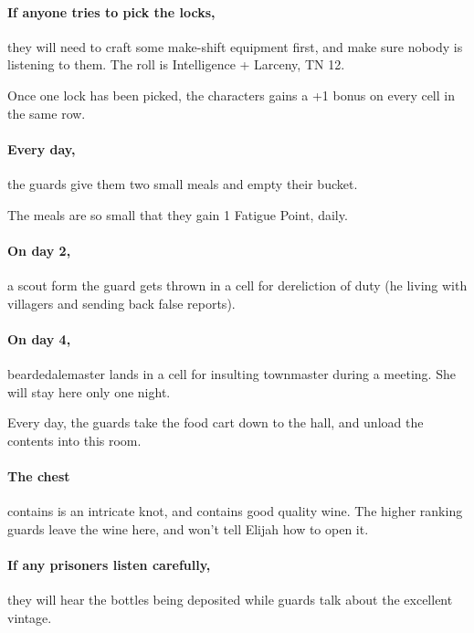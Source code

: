 \begin{multicols}{2}
\paragraph{If anyone tries to pick the locks,}
they will need to craft some make-shift equipment first, and make sure nobody is listening to them.
The roll is Intelligence + Larceny, TN 12.

Once one lock has been picked, the characters gains a +1 bonus on every cell in the same row.

\paragraph{Every day,}
the guards give them two small meals and empty their bucket.

The meals are so small that they gain 1 Fatigue Point, daily.

\paragraph{On day 2,}
a scout form the \gls{guard} gets thrown in a cell for dereliction of duty (he living with villagers and sending back false reports).

\paragraph{On day 4,}
\gls{beardedalemaster} lands in a cell for insulting \gls{townmaster} during a meeting.
She will stay here only one night.


Every day, the guards take the food cart down to the hall, and unload the contents into this room.

\paragraph{The chest}
contains is an intricate knot, and contains good quality wine.
The higher ranking guards leave the wine here, and won't tell Elijah how to open it.

\paragraph{If any prisoners listen carefully,}
they will hear the bottles being deposited while guards talk about the excellent vintage.



\end{multicols}
